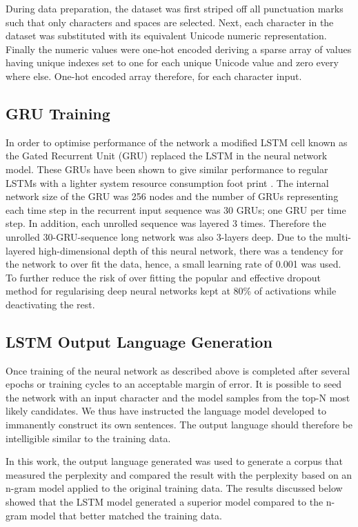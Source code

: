 \documentclass[a4paper]{article}
\begin{document}
During data preparation, the dataset was first striped off all punctuation marks such that only characters and spaces are selected.  Next, each character in the dataset was substituted with its equivalent Unicode numeric representation. Finally the numeric values were one-hot encoded deriving a sparse array of values having unique indexes set to one for each unique Unicode value and zero every where else. One-hot encoded array therefore, for each character input.

\subsection{GRU Training}

In order to optimise performance of the network a modified LSTM cell known as the Gated Recurrent Unit (GRU) replaced the LSTM in the neural network model.  These GRUs have been shown to give similar performance to regular LSTMs with a lighter system resource consumption foot print \cite{cho2014learning}. The internal network size of the GRU was 256 nodes and the number of GRUs representing each time step in the recurrent input sequence was 30 GRUs; one GRU per time step. In addition, each unrolled sequence was layered 3 times.  Therefore the unrolled 30-GRU-sequence long network was also 3-layers deep. Due to the multi-layered high-dimensional depth of this neural network, there was a tendency for the network to over fit the data, hence, a small learning rate of 0.001 was used. To further reduce the risk of over fitting the popular and effective dropout method for regularising deep neural networks kept at 80\% of activations while deactivating the rest.

\subsection{LSTM Output Language Generation}
Once training of the neural network as described above is completed after several epochs or training cycles to an acceptable margin of error. It is possible to seed the network with an input character and the model samples from the top-N most likely candidates.  We thus have instructed the language model developed to immanently construct its own sentences.  The output language should therefore be intelligible similar to the training data. 

In this work, the output language generated was used to generate a corpus that measured the perplexity and compared the result with the perplexity based on an n-gram model applied to the original training data.  The results discussed below showed that the LSTM model generated a superior model compared to the n-gram model that better matched the training data.
\end{document}
